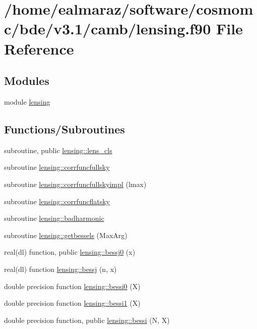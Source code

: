\hypertarget{lensing_8f90}{}\section{/home/ealmaraz/software/cosmomc/bde/v3.1/camb/lensing.f90 File Reference}
\label{lensing_8f90}
\subsection*{Modules}
\begin{DoxyCompactItemize}
\item 
module \mbox{\hyperlink{namespacelensing}{lensing}}
\end{DoxyCompactItemize}
\subsection*{Functions/\+Subroutines}
\begin{DoxyCompactItemize}
\item 
subroutine, public \mbox{\hyperlink{namespacelensing_a71d315283bcce7fb9626733365bf43e6}{lensing\+::lens\+\_\+cls}}
\item 
subroutine \mbox{\hyperlink{namespacelensing_a18ba748aa475681b240cdd9be79dd809}{lensing\+::corrfuncfullsky}}
\item 
subroutine \mbox{\hyperlink{namespacelensing_ae3afbc47d14796e30a26538f38a726dd}{lensing\+::corrfuncfullskyimpl}} (lmax)
\item 
subroutine \mbox{\hyperlink{namespacelensing_aa3cc70dd58b493d3192e97f675ffa909}{lensing\+::corrfuncflatsky}}
\item 
subroutine \mbox{\hyperlink{namespacelensing_a68242ee3fa839802f6aed94e9f8dcf73}{lensing\+::badharmonic}}
\item 
subroutine \mbox{\hyperlink{namespacelensing_a208c6bffe402d39685fb2f4509de310c}{lensing\+::getbessels}} (Max\+Arg)
\item 
real(dl) function, public \mbox{\hyperlink{namespacelensing_a8fca1155759235e997ecc5ebcb8273bc}{lensing\+::bessj0}} (x)
\item 
real(dl) function \mbox{\hyperlink{namespacelensing_a53ac785c7d5c53f22122c476b62c4368}{lensing\+::bessj}} (n, x)
\item 
double precision function \mbox{\hyperlink{namespacelensing_a19d7fd08c1d4dc42d7e7aad518d14c7a}{lensing\+::bessi0}} (X)
\item 
double precision function \mbox{\hyperlink{namespacelensing_a2474483511401e2796af7b20caf6796d}{lensing\+::bessi1}} (X)
\item 
double precision function, public \mbox{\hyperlink{namespacelensing_a6849d58625a3e2cf0a2a22371141eb4a}{lensing\+::bessi}} (N, X)
\end{DoxyCompactItemize}

